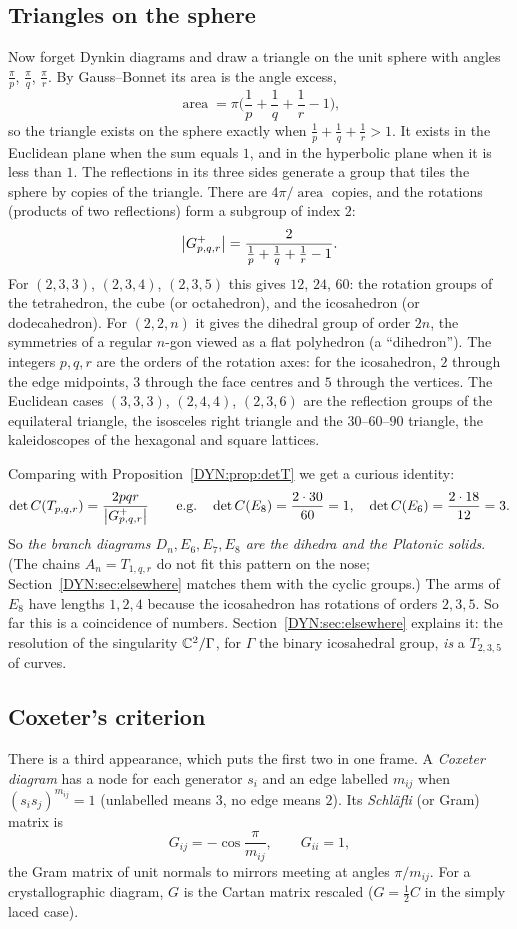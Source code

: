 \subsection*{Triangles on the sphere}
Now forget Dynkin diagrams and draw a triangle on the unit sphere with angles $\frac\pi p$, $\frac\pi q$,
$\frac\pi r$. By Gauss--Bonnet its area is the angle excess,
\[
  \operatorname{area}=\pi\Big(\frac1p+\frac1q+\frac1r-1\Big),
\]
so the triangle exists on the sphere exactly when $\frac1p+\frac1q+\frac1r>1$. It exists in the
Euclidean plane when the sum equals $1$, and in the hyperbolic plane when it is less than $1$. The
reflections in its three sides generate a group that tiles the sphere by copies of the triangle. There
are $4\pi/\operatorname{area}$ copies, and the rotations (products of two reflections) form a subgroup
of index $2$:
\[
  \left\lvert G^+_{p,q,r} \right\rvert=\frac{2}{\frac1p+\frac1q+\frac1r-1}.
\]
For $(2,3,3)$, $(2,3,4)$, $(2,3,5)$ this gives $12$, $24$, $60$: the rotation groups of the tetrahedron,
the cube (or octahedron), and the icosahedron (or dodecahedron). For $(2,2,n)$ it gives the dihedral
group of order $2n$, the symmetries of a regular $n$-gon viewed as a flat polyhedron (a ``dihedron'').
The integers $p,q,r$ are the orders of the rotation axes: for the icosahedron, $2$ through the edge
midpoints, $3$ through the face centres and $5$ through the vertices. The Euclidean cases $(3,3,3)$,
$(2,4,4)$, $(2,3,6)$ are the reflection groups of the equilateral triangle, the isosceles right
triangle and the $30$--$60$--$90$ triangle, the kaleidoscopes of the hexagonal and square lattices.

Comparing with Proposition~\ref{DYN:prop:detT} we get a curious identity:
\[
  \det C(T_{p,q,r})=\frac{2pqr}{\left\lvert G^+_{p,q,r} \right\rvert}\qquad\text{e.g.}\quad
  \det C(E_8)=\frac{2\cdot30}{60}=1,\quad \det C(E_6)=\frac{2\cdot18}{12}=3.
\]
So \emph{the branch diagrams $D_n,E_6,E_7,E_8$ are the dihedra and the Platonic solids}. (The chains
$A_n=T_{1,q,r}$ do not fit this pattern on the nose; Section~\ref{DYN:sec:elsewhere} matches them with
the cyclic groups.) The arms of $E_8$ have lengths $1,2,4$ because the icosahedron
has rotations of orders $2,3,5$. So far this is a coincidence of numbers. Section~\ref{DYN:sec:elsewhere}
explains it: the resolution of the singularity $\mathbb{C}^2/\Gamma$, for $\Gamma$ the binary icosahedral group,
\emph{is} a $T_{2,3,5}$ of curves.

\subsection*{Coxeter's criterion}
There is a third appearance, which puts the first two in one frame. A \emph{Coxeter diagram} has a node for each
generator $s_i$ and an edge labelled $m_{ij}$ when $(s_is_j)^{m_{ij}}=1$ (unlabelled means $3$, no edge
means $2$). Its \emph{Schl\"afli} (or Gram) matrix is
\[
  G_{ij}=-\cos\frac{\pi}{m_{ij}},\qquad G_{ii}=1,
\]
the Gram matrix of unit normals to mirrors meeting at angles $\pi/m_{ij}$. For a crystallographic
diagram, $G$ is the Cartan matrix rescaled ($G=\frac12C$ in the simply laced case).

